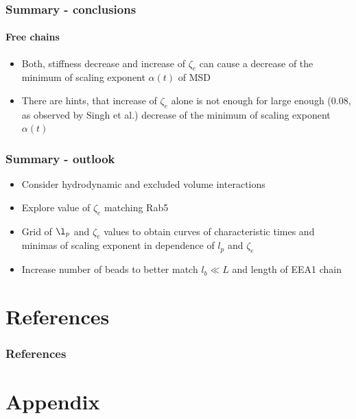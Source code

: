 \documentclass[handout]{beamer}
\begin{document}
\begin{frame}
    \frametitle{Summary - conclusions}
    \framesubtitle{Free chains}
    \begin{itemize}
        \item Both, stiffness decrease and increase of $\zeta_e$ can cause a decrease
        of the minimum of scaling exponent $\alpha(t)$ of MSD
        \item There are hints, that increase of $\zeta_e$ alone is not enough for
        large enough (0.08, as observed by Singh et al.) decrease of the minimum of scaling exponent $\alpha(t)$ 
    \end{itemize}
\end{frame}


\begin{frame}
    \frametitle{Summary - outlook}
    \begin{itemize}
        \item Consider hydrodynamic and excluded volume interactions
        \item Explore value of $\zeta_e$ matching Rab5
        \item Grid of $\l_p$ and $\zeta_e$ values to obtain curves
        of characteristic times and minimas of scaling exponent in dependence of
        $l_p$ and $\zeta_e$
        \item Increase number of beads to better match $l_b \ll L$ and
        length of EEA1 chain
    \end{itemize}
\end{frame}

\section{References}


\begin{frame}
    \frametitle{References}
    
    
\end{frame}


\section{Appendix}
\end{document}
